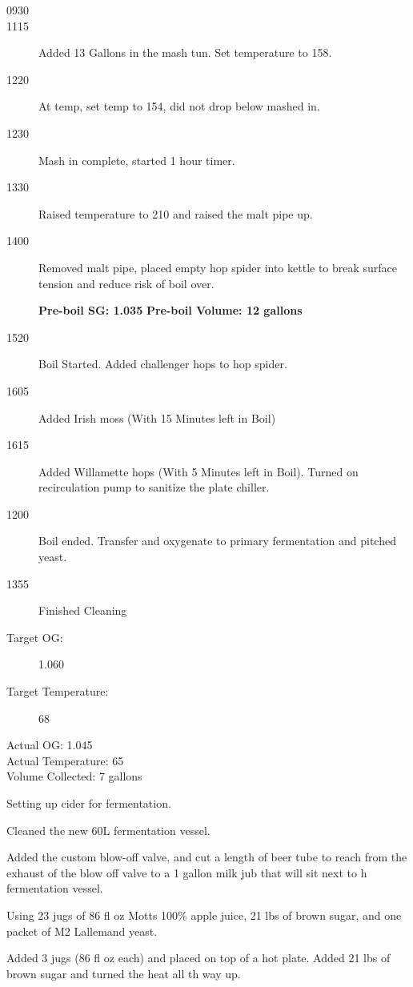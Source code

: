 \begin{description}
    \item[0930] 
    \item[1115] Added 13 Gallons in the mash tun.  Set temperature to 158.  
    \item[1220] At temp, set temp to 154, did not drop below mashed in.
    \item[1230] Mash in complete, started 1 hour timer.
    \item[1330] Raised temperature to 210 and raised the malt pipe up.
    \item[1400] Removed malt pipe, placed empty hop spider into kettle to break surface tension and reduce risk of boil over.

\textbf{Pre-boil SG: 1.035}
\textbf{Pre-boil Volume: 12 gallons}

    \item[1520] Boil Started. Added challenger hops to hop spider.
    \item[1605] Added Irish moss (With 15 Minutes left in Boil)
    \item[1615] Added Willamette hops (With 5 Minutes left in Boil).  Turned on recirculation pump to sanitize the plate chiller.
    \item[1200] Boil ended.  Transfer and oxygenate to primary fermentation and pitched yeast.
    \item[1355] Finished Cleaning
    \item[Target OG:] 1.060
    \item[Target Temperature:] 68
    \item[Actual OG: 1.045] 
    \item[Actual Temperature: 65] 
    \item[Volume Collected: 7 gallons] 
\end{description}


\def\todaysdate{20230923}
\newday{\todaysdate}\label{\todaysdate}

Setting up cider for fermentation.

Cleaned the new 60L fermentation vessel.

Added the custom blow-off valve, and cut a length of beer tube to reach from the exhaust of the blow off valve to a 1 gallon milk jub that will sit next to h fermentation vessel.

Using 23 jugs of 86 fl oz Motts 100\% apple juice, 21 lbs of brown sugar, and one packet of M2 Lallemand yeast.

Added 3 jugs (86 fl oz each) and placed on top of a hot plate.  Added 21 lbs of brown sugar and turned the heat all th way up.


